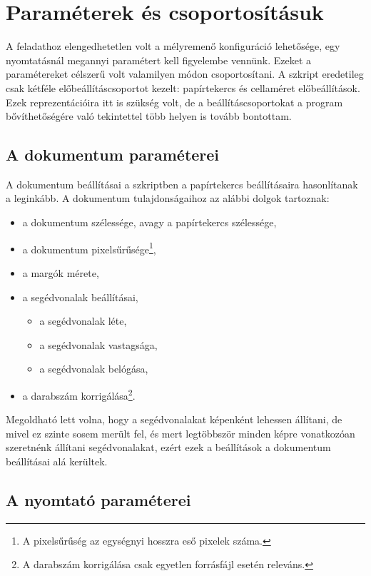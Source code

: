 \section{Paraméterek és csoportosításuk}

A feladathoz elengedhetetlen volt a mélyremenő konfiguráció lehetősége, egy nyomtatásnál megannyi paramétert kell figyelembe vennünk. Ezeket a paramétereket célszerű volt valamilyen módon csoportosítani. A szkript eredetileg csak kétféle előbeállításcsoportot kezelt: papírtekercs és cellaméret előbeállítások. Ezek reprezentációira itt is szükség volt, de a beállításcsoportokat a program bővíthetőségére való tekintettel több helyen is tovább bontottam.

\subsection{A dokumentum paraméterei}

A dokumentum beállításai a szkriptben a papírtekercs beállításaira hasonlítanak a leginkább. A dokumentum tulajdonságaihoz az alábbi dolgok tartoznak:

\begin{itemize}
    \item a dokumentum szélessége, avagy a papírtekercs szélessége,
    \item a dokumentum pixelsűrűsége\footnote[5]{A pixelsűrűség az egységnyi hosszra eső pixelek száma.},
    \item a margók mérete,
    \item a segédvonalak beállításai,
    \begin{itemize}
        \item a segédvonalak léte,
        \item a segédvonalak vastagsága,
        \item a segédvonalak belógása,
    \end{itemize}
    \item a darabszám korrigálása\footnote[6]{A darabszám korrigálása csak egyetlen forrásfájl esetén releváns.}.
\end{itemize}

Megoldható lett volna, hogy a segédvonalakat képenként lehessen állítani, de mivel ez szinte sosem merült fel, és mert legtöbbször minden képre vonatkozóan szeretnénk állítani segédvonalakat, ezért ezek a beállítások a dokumentum beállításai alá kerültek. 

\subsection{A nyomtató paraméterei}

